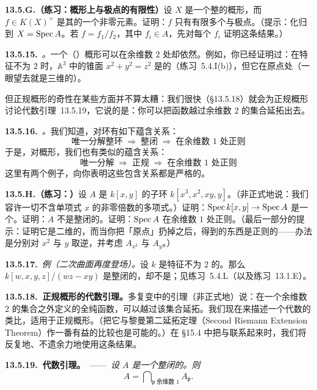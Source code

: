 \textbf{13.5.G.（练习：\trNoetherian{}概形上\trZeros{}与极点的有限性）}\quad 设 $X$ 是一个整的\trNoetherian{}概形，而 $f\in K(X)^{\times}$ 是其\trFunctionField{}的一个非零元素。证明：$f$ 只有有限多个\trZeros{}与极点。（提示：化归到 $X=\operatorname{Spec} A$。若 $f=f_1/f_2$，其中 $f_i\in A$，先对每个 $f_i$ 证明这条结果。）

\textbf{13.5.15.}\ \emph{\trhRemark{}。}\quad 一个（\trNoetherian{}）概形可以在余维数 $2$ 处\trSingular{}却依然\trNormal。例如，你已经证明过：在特征不为 $2$ 时，$\mathbb{A}^3$ 中的锥面 $x^2+y^2=z^2$ 是\trNormal{}的（\mbox{练习~5.4.I(b)}），但它在原点处\trSingular（\trZariski{}\trTangentSpace{}一眼望去就是三维的）。

但正规概形的奇性在某些方面并不算太糟：我们很快（\S13.5.18）就会为\trNoetherian{}正规概形讨论代数\trHartogs{}引理~13.5.19，它说的是：你可以把函数越过余维数 $2$ 的集合延拓出去。

\textbf{13.5.16.}\ \emph{\trhRemark{}。}\quad 我们知道，对\trNoetherian{}环有如下蕴含关系：
\[
\text{唯一分解整环}\;\Longrightarrow\;\text{整闭}\;\Longrightarrow\;\text{在余维数~1 处正则}
\]
于是，对\trLocally\trNoetherian{}概形，我们也有类似的蕴含关系：
\[
\text{唯一分解}\;\Longrightarrow\;\text{正规}\;\Longrightarrow\;\text{在余维数~1 处正则}
\]
这里有两个例子，向你表明这些包含关系都是严格的。

\textbf{13.5.H.（练习：\trPinchedPlane）}\quad 设 $A$ 是 $k[x,y]$ 的子环 $k[x^3,x^2,xy,y]$。（非正式地说：我们容许一切不含单项式 $x$ 的非零倍数的多项式。）证明：$\operatorname{Spec} k[x,y]\to\operatorname{Spec} A$ 是一个\trNormalization。证明：$A$ 不是整闭的。证明：$\operatorname{Spec} A$ 在余维数 $1$ 处正则。（最后一部分的提示：证明它是二维的，而当你把「原点」扔掉之后，得到的东西是正则的——办法是分别对 $x^2$ 与 $y$ 取逆，并考虑 $A_{x^2}$ 与 $A_y$。）

\textbf{13.5.17.}\ \emph{例（二次曲面再度登场）。}\quad 设 $k$ 是特征不为 $2$ 的\trAlgClosedField。那么 $k[w,x,y,z]/(wz-xy)$ 是整闭的，却不是\trUFD；见\mbox{练习~5.4.L}（以及\mbox{练习~13.1.E}）。

\textbf{13.5.18.\ \trNoetherian{}正规概形的代数\trHartogs{}引理。}\quad 多复变中的\trHartogs{}引理（非正式地）说：在一个余维数 $2$ 的集合之外定义的全纯函数，可以越过该集合延拓。我们现在来描述一个代数的类比，适用于\trNoetherian{}正规概形。（把它与黎曼第二延拓定理（Second Riemann Extension Theorem）作一番有益的比较也是可能的。）在 \S15.4 中把\trLineBundle{}与\trDivisor{}联系起来时，我们将反复地、不遗余力地使用这条结果。

\textbf{13.5.19.\ 代数\trHartogs{}引理。}\ ——\ \emph{设 $A$ 是一个整闭的\trNoetherian\trIntegralDomain。则}
\[
A=\bigcap\nolimits_{\mathfrak{p}\ \text{余维数 }1}A_{\mathfrak{p}}.
\]

